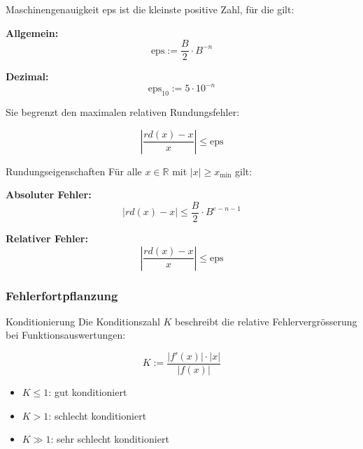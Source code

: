 \begin{lemma}{Maschinengenauigkeit} 
    eps ist die kleinste positive Zahl, für die gilt:
    \vspace{-3mm}\\
\begin{minipage}[t]{0.35\textwidth}
    \textbf{Allgemein:}  $$\text{eps} := \frac{B}{2} \cdot B^{-n}$$
\end{minipage}
\hspace{6mm}
\begin{minipage}[t]{0.35\textwidth}
    \textbf{Dezimal:}  $$\text{eps}_{10} := 5 \cdot 10^{-n}$$
\end{minipage}

\begin{minipage}[t]{0.45\textwidth}
    Sie begrenzt den maximalen relativen Rundungsfehler:
\end{minipage}
\begin{minipage}{0.5\textwidth}
    $$\left|\frac{rd(x)-x}{x}\right| \leq \text{eps}$$
\end{minipage}
\end{lemma}

\begin{corollary}{Rundungseigenschaften}
Für alle $x \in \mathbb{R}$ mit $|x| \geq x_{\text{min}}$ gilt:
\vspace{1mm}\\
\begin{minipage}[t]{0.45\textwidth}
    \textbf{Absoluter Fehler:}  $$|rd(x) - x| \leq \frac{B}{2} \cdot B^{e-n-1}$$
\end{minipage}
\hspace{3mm}
\begin{minipage}[t]{0.35\textwidth}
    \textbf{Relativer Fehler:}  $$\left|\frac{rd(x)-x}{x}\right| \leq \text{eps}$$
\end{minipage}
\end{corollary}

\subsubsection{Fehlerfortpflanzung}

\begin{concept}{Konditionierung}
    Die Konditionszahl $K$ beschreibt die relative Fehlervergrösserung bei Funktionsauswertungen:
    \vspace{1mm}\\
\begin{minipage}{0.3\textwidth}
    \vspace{-2mm}
    $$K := \frac{|f'(x)| \cdot |x|}{|f(x)|}$$
\end{minipage}
\hspace{2mm}
\begin{minipage}{0.6\textwidth}
\begin{itemize}
    \item $K \leq 1$: gut konditioniert
    \item $K > 1$: schlecht konditioniert
    \item $K \gg 1$: sehr schlecht konditioniert
\end{itemize}
\end{minipage}
\end{concept}

